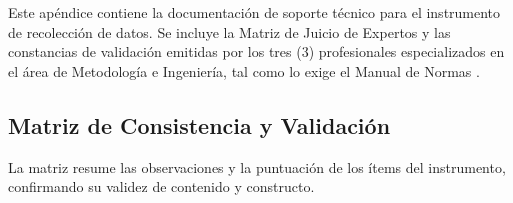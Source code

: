 
Este apéndice contiene la documentación de soporte técnico para el instrumento de recolección de datos. Se incluye la Matriz de Juicio de Expertos y las constancias de validación emitidas por los tres (3) profesionales especializados en el área de Metodología e Ingeniería, tal como lo exige el Manual de Normas \textcite{online:unefa2022}.

\lipsum[32]

\subsection*{Matriz de Consistencia y Validación}
La matriz resume las observaciones y la puntuación de los ítems del instrumento, confirmando su validez de contenido y constructo.

\lipsum[33-34]